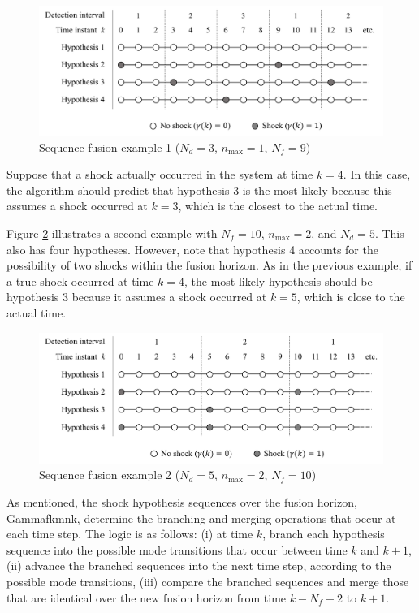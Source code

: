 \begin{figure}[htp]
	\centering
	\includegraphics[width=13cm]{images/mm_obs_seq_rob1.pdf}
	\caption{Sequence fusion example 1 ($N_d=3$, $n_\text{max}=1$, $N_f=9$)}
	\label{fig:mm-obs-seq-SFex1}
\end{figure}

Suppose that a shock actually occurred in the system at time $k=4$. In this case, the algorithm should predict that hypothesis 3 is the most likely because this assumes a shock occurred at $k=3$, which is the closest to the actual time.

Figure \ref{fig:mm-obs-seq-SFex2} illustrates a second example with $N_f=10$, $n_\text{max}=2$, and $N_d=5$. This also has four hypotheses. However, note that hypothesis 4 accounts for the possibility of two shocks within the fusion horizon. As in the previous example, if a true shock occurred at time $k=4$, the most likely hypothesis should be hypothesis 3 because it assumes a shock occurred at $k=5$, which is close to the actual time.

\begin{figure}[htp]
	\centering
	\includegraphics[width=13cm]{images/mm_obs_seq_rob2.pdf}
	\caption{Sequence fusion example 2 ($N_d=5$, $n_\text{max}=2$, $N_f=10$)}
	\label{fig:mm-obs-seq-SFex2}
\end{figure}

As mentioned, the shock hypothesis sequences over the fusion horizon, \gls{Gammafkmnk}, determine the branching and merging operations that occur at each time step. The logic is as follows: (i) at time $k$, branch each hypothesis sequence into the possible mode transitions that occur between time $k$ and $k+1$, (ii) advance the branched sequences into the next time step, according to the possible mode transitions, (iii) compare the branched sequences and merge those that are identical over the new fusion horizon from time $k-N_f+2$ to $k+1$.


